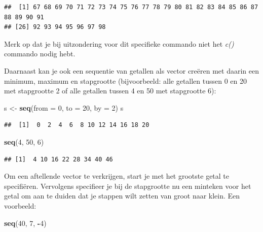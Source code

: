 \documentclass[
]{book}
\newenvironment{Shaded}{\begin{snugshade}}{\end{snugshade}}
\newcommand{\AttributeTok}[1]{\textcolor[rgb]{0.13,0.29,0.53}{#1}}
\newcommand{\DecValTok}[1]{\textcolor[rgb]{0.00,0.00,0.81}{#1}}
\newcommand{\FunctionTok}[1]{\textcolor[rgb]{0.13,0.29,0.53}{\textbf{#1}}}
\newcommand{\NormalTok}[1]{#1}
\newcommand{\OtherTok}[1]{\textcolor[rgb]{0.56,0.35,0.01}{#1}}
\newcommand{\SpecialCharTok}[1]{\textcolor[rgb]{0.81,0.36,0.00}{\textbf{#1}}}
\begin{document}
\begin{verbatim}
##  [1] 67 68 69 70 71 72 73 74 75 76 77 78 79 80 81 82 83 84 85 86 87 88 89 90 91
## [26] 92 93 94 95 96 97 98
\end{verbatim}

Merk op dat je bij uitzondering voor dit specifieke commando niet het \emph{c()} commando nodig hebt.

Daarnaast kan je ook een sequentie van getallen als vector creëren met daarin een minimum, maximum en stapgrootte (bijvoorbeeld: alle getallen tussen 0 en 20 met stapgrootte 2 of alle getallen tussen 4 en 50 met stapgrootte 6):

\begin{Shaded}
\begin{Highlighting}[]
\NormalTok{s }\OtherTok{\textless{}{-}} \FunctionTok{seq}\NormalTok{(}\AttributeTok{from =} \DecValTok{0}\NormalTok{, }\AttributeTok{to =} \DecValTok{20}\NormalTok{, }\AttributeTok{by =} \DecValTok{2}\NormalTok{)}
\NormalTok{s}
\end{Highlighting}
\end{Shaded}

\begin{verbatim}
##  [1]  0  2  4  6  8 10 12 14 16 18 20
\end{verbatim}

\begin{Shaded}
\begin{Highlighting}[]
\FunctionTok{seq}\NormalTok{(}\DecValTok{4}\NormalTok{, }\DecValTok{50}\NormalTok{, }\DecValTok{6}\NormalTok{)}
\end{Highlighting}
\end{Shaded}

\begin{verbatim}
## [1]  4 10 16 22 28 34 40 46
\end{verbatim}

Om een aftellende vector te verkrijgen, start je met het grootste getal te specifiëren. Vervolgens specifieer je bij de stapgrootte nu een minteken voor het getal om aan te duiden dat je stappen wilt zetten van groot naar klein. Een voorbeeld:

\begin{Shaded}
\begin{Highlighting}[]
\FunctionTok{seq}\NormalTok{(}\DecValTok{40}\NormalTok{, }\DecValTok{7}\NormalTok{, }\SpecialCharTok{{-}}\DecValTok{4}\NormalTok{)}
\end{Highlighting}
\end{Shaded}
\end{document}
